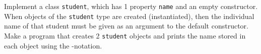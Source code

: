 \label{class:myFirstClass}
Implement a class \lstinline{student}, which has 1 property \lstinline{name} and an empty constructor. When objects of the \lstinline{student} type are created (instantiated), then the individual name of that student must be given as an argument to the default constructor. Make a program that creates 2 \lstinline{student} objects and prints the name stored in each object using the -notation.
